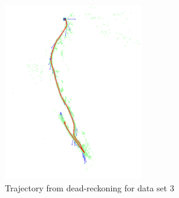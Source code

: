 \documentclass[conference]{IEEEtran}
\begin{document}
\begin{figure}[H]
\centerline{\includegraphics[width=60mm]{mapping_34.png}}
\caption{Trajectory from dead-reckoning for data set 3}
\end{figure} 
\end{document}
